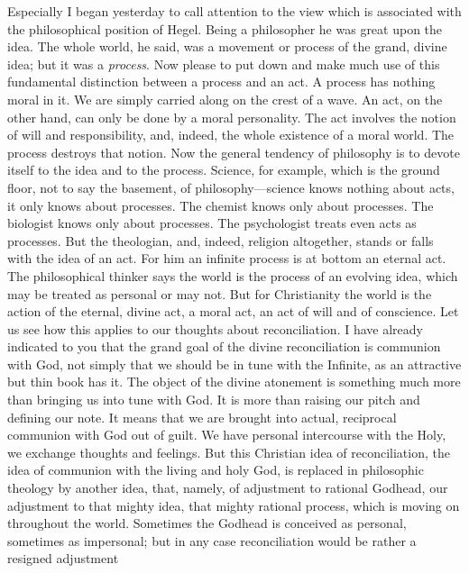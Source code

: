 \documentclass[12pt,a5paper,twoside,titlepage]{book}
\begin{document}
Especially I began yesterday to call attention 
to the view which is associated with the philosophical 
position of Hegel. Being a philosopher 
he was great upon the idea. The whole world, 
he said, was a movement or process of the grand, 
divine idea; but it was a \textit{process}. Now please 
to put down and make much use of this fundamental 
distinction between a process and an 
act. A process has nothing moral in it. We 
are simply carried along on the crest of a wave. 
An act, on the other hand, can only be done by 
a moral personality. The act involves the notion 
of will and responsibility, and, indeed, the whole 
existence of a moral world. The process destroys 
that notion. Now the general tendency of 
philosophy is to devote itself to the idea and 
to the process. Science, for example, which is 
the ground floor, not to say the basement, of 
philosophy---science knows nothing about acts, 
it only knows about processes. The chemist 
knows only about processes. The biologist 
knows only about processes. The psychologist 
treats even acts as processes. But the theologian, 
and, indeed, religion altogether, stands 
or falls with the idea of an act. For him an 
infinite process is at bottom an eternal act. The 
philosophical thinker says the world is the process 
of an evolving idea, which may be treated as 
personal or may not. But for Christianity the 
world is the action of the eternal, divine act, 
a moral act, an act of will and of conscience. 
Let us see how this applies to our thoughts 
about reconciliation. I have already indicated 
to you that the grand goal of the divine reconciliation 
is communion with God, not simply 
that we should be in tune with the Infinite, 
as an attractive but thin book has it. The 
object of the divine atonement is something 
much more than bringing us into tune with 
God. It is more than raising our pitch and 
defining our note. It means that we are 
brought into actual, reciprocal communion with 
God out of guilt. We have personal intercourse 
with the Holy, we exchange thoughts and feelings. 
But this Christian idea of reconciliation, 
the idea of communion with the living and 
holy God, is replaced in philosophic theology by 
another idea, that, namely, of adjustment to 
rational Godhead, our adjustment to that 
mighty idea, that mighty rational process, 
which is moving on throughout the world. 
Sometimes the Godhead is conceived as personal, 
sometimes as impersonal; but in any case 
reconciliation would be rather a resigned adjustment 
\end{document}
